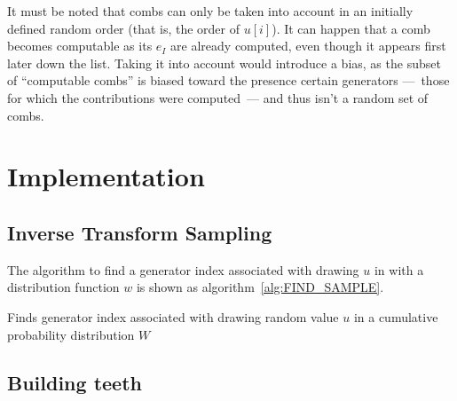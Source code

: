 \documentclass[./thesis.tex]{subfiles}
\begin{document}
It must be noted that combs can only be taken into account in an initially defined random order (that is, the order of $u[i]$).
It can happen that a comb becomes computable as its $e_I$ are already computed, even though it appears first later down the list. Taking it into account would introduce a bias, as the subset of ``computable combs'' is biased toward the presence certain generators ---~those for which the contributions were computed~--- and thus isn't a random set of combs.


\section{Implementation}

\subsection{Inverse Transform Sampling}

The algorithm to find a generator index associated with drawing $u$ in with a distribution function $w$ is shown as algorithm~\ref{alg:FIND_SAMPLE}.

\begin{algorithm}
\caption[FIND\_SAMPLE]{Finds generator index associated with drawing random value $u$ in a cumulative probability distribution $W$}
\label{alg:FIND_SAMPLE}

	
	
\end{algorithm}

\subsection{Building teeth}
\end{document}
